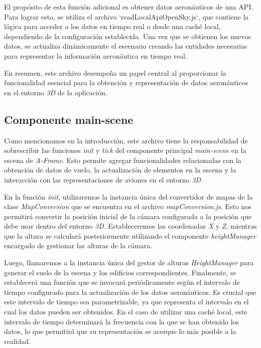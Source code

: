\documentclass[a4paper, 11pt]{book}
\begin{document}
El propósito de esta función adicional es obtener datos aeronáuticos de una API. Para lograr esto, se utiliza el archivo `readLocalApiOpenSky.js`, que contiene la lógica para acceder a los datos en tiempo real o desde una caché local, dependiendo de la configuración establecida. Una vez que se obtienen los nuevos datos, se actualiza dinámicamente el escenario creando las entidades necesarias para representar la información aeronáutica en tiempo real.

En resumen, este archivo desempeña un papel central al proporcionar la funcionalidad esencial para la obtención y representación de datos aeronáuticos en el entorno \emph{3D} de la aplicación.

\subsection{Componente main-scene}
\label{sec:mainScene}
Como mencionamos en la introducción, este archivo tiene la responsabilidad de sobrescribir las funciones \emph{init} y \emph{tick} del componente principal \emph{main-scene} en la escena de \emph{A-Frame}. Esto permite agregar funcionalidades relacionadas con la obtención de datos de vuelo, la actualización de elementos en la escena y la interacción con las representaciones de aviones en el entorno \emph{3D}.

En la función \emph{init}, utilizaremos la instancia única del convertidor de mapas de la clase \emph{MapConversion} que se encuentra en el archivo \emph{mapConversion.js}. Esto nos permitirá convertir la posición inicial de la cámara configurada a la posición que debe usar dentro del entorno \emph{3D}. Estableceremos las coordenadas \emph{X} y \emph{Z}, mientras que la altura se calculará posteriormente utilizando el componente \emph{heightManager} encargado de gestionar las alturas de la cámara.

Luego, llamaremos a la instancia única del gestor de alturas \emph{HeightManager} para generar el suelo de la escena y los edificios correspondientes.
Finalmente, se establecerá una función que se invocará periódicamente según el intervalo de tiempo configurado para la actualización de los datos aeronáuticos. Es crucial que este intervalo de tiempo sea parametrizable, ya que representa el intervalo en el cual los datos pueden ser obtenidos. En el caso de utilizar una caché local, este intervalo de tiempo determinará la frecuencia con la que se han obtenido los datos, lo que permitirá que su representación se acerque lo más posible a la realidad.
\end{document}

